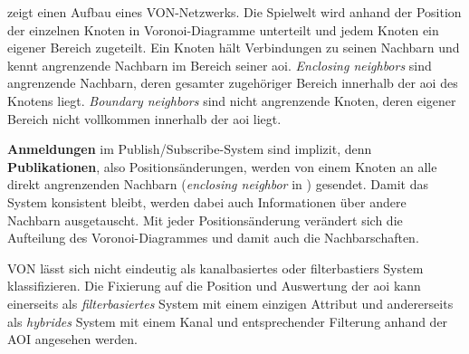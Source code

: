  zeigt einen Aufbau eines VON-Netzwerks. Die Spielwelt wird anhand der Position der einzelnen Knoten in Voronoi-Diagramme \cite{Aurenhammer1991Voronoi} unterteilt und jedem Knoten ein eigener Bereich zugeteilt. Ein Knoten hält Verbindungen zu seinen Nachbarn und kennt angrenzende Nachbarn im Bereich seiner \ac{aoi}. \emph{Enclosing neighbors} sind angrenzende Nachbarn, deren gesamter zugehöriger Bereich innerhalb der \ac{aoi} des Knotens liegt. \emph{Boundary neighbors} sind nicht angrenzende Knoten, deren eigener Bereich nicht vollkommen innerhalb der \ac{aoi} liegt.

\textbf{Anmeldungen} im Publish/Subscribe-System sind implizit, denn \textbf{Publikationen}, also Positionsänderungen, werden von einem Knoten an alle direkt angrenzenden Nachbarn (\emph{enclosing neighbor} in ) gesendet. Damit das System konsistent bleibt, werden dabei auch Informationen über andere Nachbarn ausgetauscht. Mit jeder Positionsänderung verändert sich die Aufteilung des Voronoi-Diagrammes und damit auch die Nachbarschaften.

VON lässt sich nicht eindeutig als kanalbasiertes oder filterbastiers System klassifizieren. Die Fixierung auf die Position und Auswertung der \ac{aoi} kann einerseits als \emph{filterbasiertes} System mit einem einzigen Attribut und andererseits als \emph{hybrides} System mit einem  Kanal und entsprechender Filterung anhand der AOI angesehen werden.

